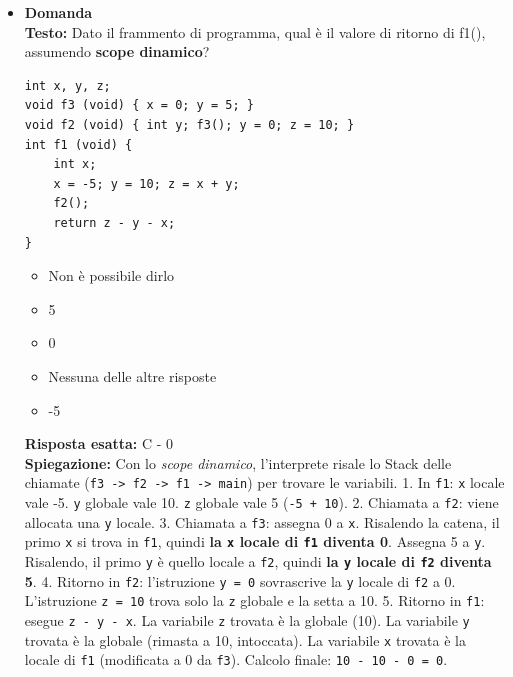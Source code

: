 \documentclass[12pt, a4paper]{article}
\newcounter{domandateoria}
\begin{document}
\begin{itemize}
    \item {}\textbf{Domanda \thedomandateoria} \\
    \textbf{Testo:} Dato il frammento di programma, qual è il valore di ritorno di f1(), assumendo \textbf{scope dinamico}?
\begin{verbatim}
int x, y, z;
void f3 (void) { x = 0; y = 5; }
void f2 (void) { int y; f3(); y = 0; z = 10; }
int f1 (void) {
    int x;
    x = -5; y = 10; z = x + y;
    f2();
    return z - y - x;
}
\end{verbatim}
    \begin{itemize}
        \item[A)] Non è possibile dirlo
        \item[B)] 5
        \item[C)] 0
        \item[D)] Nessuna delle altre risposte
        \item[E)] -5
    \end{itemize}
    \textbf{Risposta esatta:} C - 0 \\
    \textbf{Spiegazione:} Con lo \textit{scope dinamico}, l'interprete risale lo Stack delle chiamate (\texttt{f3 -> f2 -> f1 -> main}) per trovare le variabili.
    1. In \texttt{f1}: \texttt{x} locale vale -5. \texttt{y} globale vale 10. \texttt{z} globale vale 5 (\texttt{-5 + 10}).
    2. Chiamata a \texttt{f2}: viene allocata una \texttt{y} locale.
    3. Chiamata a \texttt{f3}: assegna 0 a \texttt{x}. Risalendo la catena, il primo \texttt{x} si trova in \texttt{f1}, quindi \textbf{la \texttt{x} locale di \texttt{f1} diventa 0}. Assegna 5 a \texttt{y}. Risalendo, il primo \texttt{y} è quello locale a \texttt{f2}, quindi \textbf{la \texttt{y} locale di \texttt{f2} diventa 5}.
    4. Ritorno in \texttt{f2}: l'istruzione \texttt{y = 0} sovrascrive la \texttt{y} locale di \texttt{f2} a 0. L'istruzione \texttt{z = 10} trova solo la \texttt{z} globale e la setta a 10.
    5. Ritorno in \texttt{f1}: esegue \texttt{z - y - x}. La variabile \texttt{z} trovata è la globale (10). La variabile \texttt{y} trovata è la globale (rimasta a 10, intoccata). La variabile \texttt{x} trovata è la locale di \texttt{f1} (modificata a 0 da \texttt{f3}).
    Calcolo finale: \texttt{10 - 10 - 0 = 0}.
    \vspace{0.3cm}

\newpage


\end{itemize}
\end{document}
